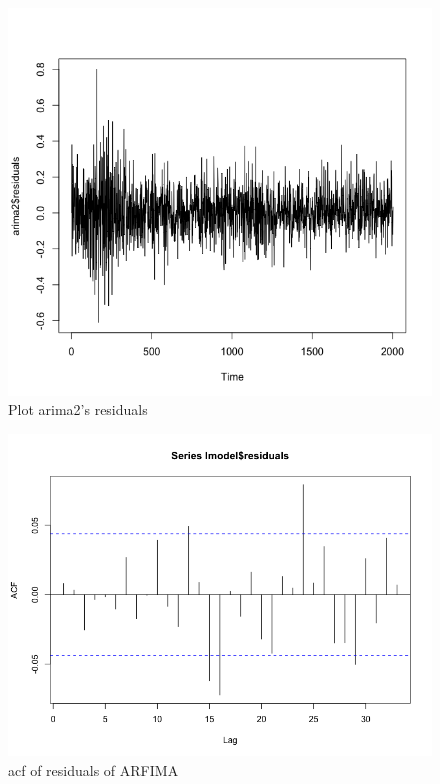 \documentclass[a4paper,10pt]{article}
\begin{document}
\begin{figure}[H]
\centering
\caption{Plot arima2's residuals}
\includegraphics[scale=.5]{arima_residuals.png}
\end{figure}

\begin{figure}[H]
\centering
\caption{acf of residuals of ARFIMA}
\includegraphics[scale=.5]{longacf.png}
\end{figure}


\newpage 
\end{document}
